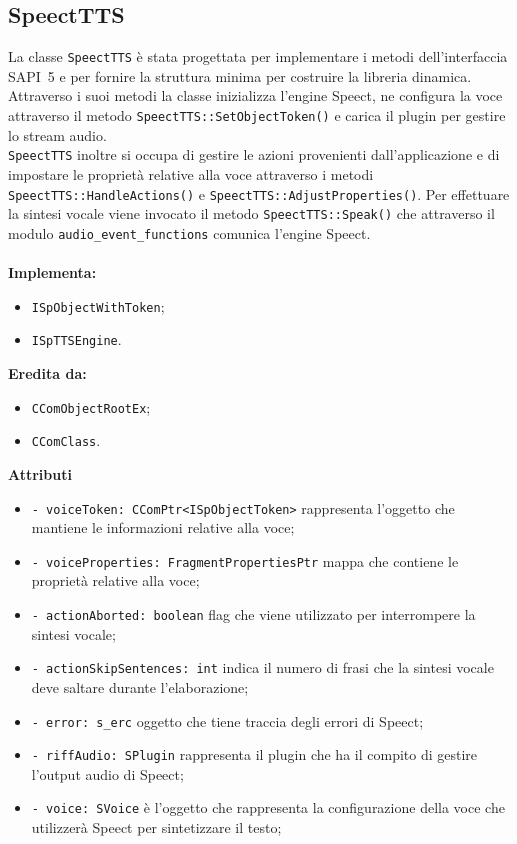 \subsection{SpeectTTS}
La classe \texttt{SpeectTTS} è stata progettata per implementare i metodi dell'interfaccia SAPI~5 e per fornire la struttura minima per costruire la libreria dinamica.
Attraverso i suoi metodi la classe inizializza l'engine Speect, ne configura la voce attraverso il metodo \texttt{SpeectTTS::SetObjectToken()} e carica il plugin per gestire lo stream audio.\\
\texttt{SpeectTTS} inoltre si occupa di gestire le azioni provenienti dall'applicazione e di impostare le proprietà relative alla voce attraverso i metodi \texttt{SpeectTTS::HandleActions()} e \texttt{SpeectTTS::AdjustProperties()}.
Per effettuare la sintesi vocale viene invocato il metodo \texttt{SpeectTTS::Speak()} che attraverso il modulo \texttt{audio\_event\_functions} comunica l'engine Speect.\\\\
\textbf{Implementa:}
\begin{itemize}
	\item \texttt{ISpObjectWithToken};
	\item \texttt{ISpTTSEngine}.
\end{itemize}
\textbf{Eredita da:}
\begin{itemize}
	\item \texttt{CComObjectRootEx};
	\item \texttt{CComClass}.
\end{itemize}
\textbf{Attributi}
\begin{itemize}
	\item \texttt{- voiceToken: CComPtr<ISpObjectToken>} rappresenta l'oggetto che mantiene le informazioni relative alla voce;
	\item \texttt{- voiceProperties: FragmentPropertiesPtr} mappa che contiene le proprietà relative alla voce;
	\item \texttt{- actionAborted: boolean} flag che viene utilizzato per interrompere la sintesi vocale;
	\item \texttt{- actionSkipSentences: int} indica il numero di frasi che la sintesi vocale deve saltare durante l'elaborazione;
	\item \texttt{- error: s\_erc} oggetto che tiene traccia degli errori di Speect;
	\item \texttt{- riffAudio: SPlugin} rappresenta il plugin che ha il compito di gestire l'output audio di Speect;
	\item \texttt{- voice: SVoice} è l'oggetto che rappresenta la configurazione della voce che utilizzerà Speect per sintetizzare il testo;   
\end{itemize}
